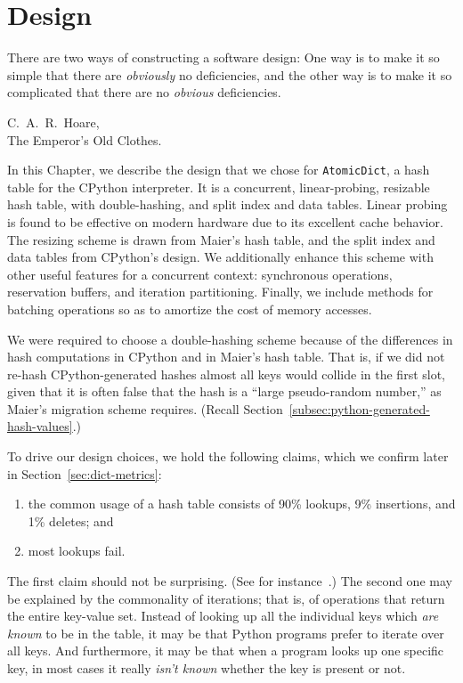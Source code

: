 \chapter{Design}\label{ch:design}


\epigraph{
    There are two ways of constructing a software design: One way is to make it so simple that there are \emph{obviously} no deficiencies, and the other way is to make it so complicated that there are no \emph{obvious} deficiencies.
}{C.\ A.\ R.\ Hoare,\\The Emperor's Old Clothes.}


In this Chapter, we describe the design that we chose for \texttt{AtomicDict}, a hash table for the CPython interpreter.
It is a concurrent, linear-probing, resizable hash table, with double-hashing, and split index and data tables.
Linear probing is found to be effective on modern hardware due to its excellent cache behavior.
The resizing scheme is drawn from Maier's hash table, and the split index and data tables from CPython's design.
We additionally enhance this scheme with other useful features for a concurrent context: synchronous operations, reservation buffers, and iteration partitioning.
Finally, we include methods for batching operations so as to amortize the cost of memory accesses.

We were required to choose a double-hashing scheme because of the differences in hash computations in CPython and in Maier's hash table.
That is, if we did not re-hash CPython-generated hashes almost all keys would collide in the first slot, given that it is often false that the hash is a ``large pseudo-random number,'' as Maier's migration scheme requires.
(Recall Section~\ref{subsec:python-generated-hash-values}.)

To drive our design choices, we hold the following claims, which we confirm later in Section~\ref{sec:dict-metrics}:
\begin{enumerate}
    \item the common usage of a hash table consists of 90\% lookups, 9\% insertions, and 1\% deletes; and
    \item most lookups fail.
\end{enumerate}

The first claim should not be surprising.
(See for instance~\cite[\S13.1]{art-mp}.)
The second one may be explained by the commonality of iterations; that is, of operations that return the entire key-value set.
Instead of looking up all the individual keys which \emph{are known} to be in the table, it may be that Python programs prefer to iterate over all keys.
And furthermore, it may be that when a program looks up one specific key, in most cases it really \emph{isn't known} whether the key is present or not.

